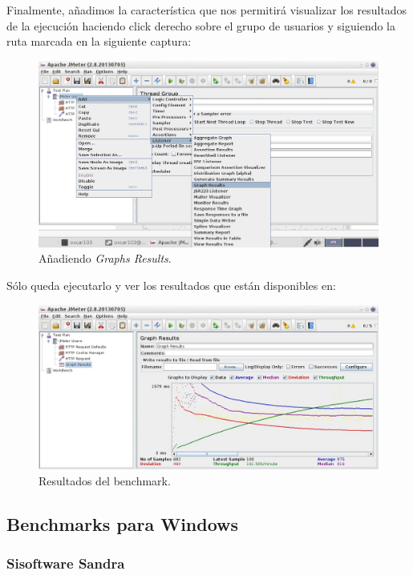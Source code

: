 \documentclass[paper=a4, fontsize=11pt]{scrartcl} %
\numberwithin{equation}{section} %
\numberwithin{figure}{section} %
\numberwithin{table}{section} %
\begin{document}
\begin{enumerate}
		Finalmente, añadimos la característica que nos permitirá visualizar los resultados de la
		ejecución haciendo click derecho sobre el grupo de usuarios y siguiendo la ruta marcada
		en la siguiente captura:
		
		\begin{figure}[H]
			\centering
			\includegraphics[width=15cm]{Ejercicio_7i.jpg}
			\caption{Añadiendo \textit{Graphs Results}.}
			\label{fig:graphs}
		\end{figure}
		
		Sólo queda ejecutarlo y ver los resultados que están disponibles en:
		
		\begin{figure}[H]
			\centering
			\includegraphics[width=15cm]{Ejercicio_7j.jpg}
			\caption{Resultados del benchmark.}
			\label{fig:results}
		\end{figure}
		
		
	\subsection{Benchmarks para Windows}
	\subsubsection{Sisoftware Sandra}

\end{enumerate}
\end{document}
